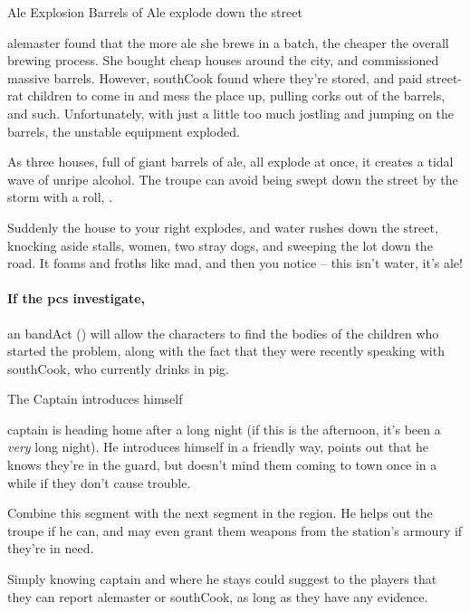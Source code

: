 {Ale Explosion}%
{Barrels of Ale explode down the street}%

\Gls{alemaster} found that the more ale she brews in a batch, the cheaper the overall brewing process.
She bought cheap houses around the city, and commissioned massive barrels.
However, \gls{southCook} found where they're stored, and paid street-rat children to come in and mess the place up, pulling corks out of the barrels, and such.
Unfortunately, with just a little too much jostling and jumping on the barrels, the unstable equipment exploded.

As three houses, full of giant barrels of ale, all explode at once, it creates a tidal wave of unripe alcohol.
The troupe can avoid being swept down the street by the storm with a  roll, \tn[8].

\begin{boxtext}
  Suddenly the house to your right explodes, and water rushes down the street, knocking aside stalls, women, two stray dogs, and sweeping the lot down the road.  It foams and froths like mad, and then you notice -- this isn't water, it's ale!
\end{boxtext}

\paragraph{If the \glspl{pc} investigate,}
an  \gls{bandAct} (\tn[10]) will allow the characters to find the bodies of the children who started the problem, along with the fact that they were recently speaking with \gls{southCook}, who currently drinks in \gls{pig}.

{The Captain}%
{ introduces himself}%

\Gls{captain} is heading home after a long night (if this is the afternoon, it's been a \emph{very} long night).
He introduces himself in a friendly way, points out that he knows they're in the \gls{guard}, but doesn't mind them coming to town once in a while if they don't cause trouble.

Combine this \gls{segment} with the next \gls{segment} in the \gls{region}.
He helps out the troupe if he can, and may even grant them \glspl{weapon} from the station's armoury if they're in need.

\captain

Simply knowing \gls{captain} and where he stays could suggest to the players that they can report \gls{alemaster} or \gls{southCook}, as long as they have any evidence.

